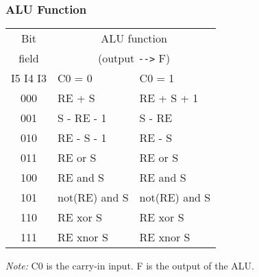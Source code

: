 \subsubsection{ALU Function}

\begin{center}
\begin{tabular}{|c|l|l|} \hline
      Bit        &  \multicolumn{2}{c|}{ALU function} \\
     field       &  \multicolumn{2}{c|}{(output \verb!-->! F)}\\ \cline{2-3}
   I5 I4 I3      &     C0 = 0      &    C0 = 1     \\ \hline
      000        &   RE + S        & RE + S + 1    \\ \hline
      001        &   S - RE - 1    & S - RE        \\ \hline
      010        &   RE - S - 1    & RE - S        \\ \hline
      011        &   RE or S       & RE or S       \\ \hline
      100        &   RE and S      & RE and S      \\ \hline
      101        &   not(RE) and S & not(RE) and S \\ \hline
      110        &   RE xor S      & RE xor S      \\ \hline
      111        &   RE xnor S     & RE xnor S     \\ \hline
\end{tabular}
\end{center}

{\em Note:} C0 is the carry-in input. F is the output of the ALU.


